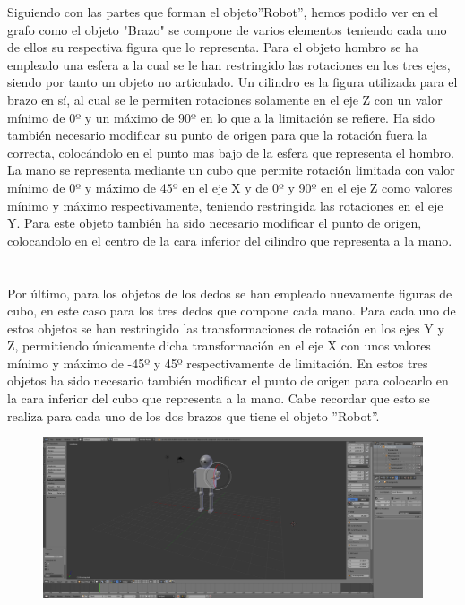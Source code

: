 \documentclass[10pt]{article}
\begin{document}
Siguiendo con las partes que forman el objeto''Robot'', hemos podido ver en el grafo como el objeto "Brazo" se compone de varios elementos teniendo cada uno de ellos su respectiva figura que lo representa. Para el objeto hombro se ha empleado una esfera a la cual se le han restringido las rotaciones en los tres ejes, siendo por tanto un objeto no articulado. Un cilindro es la figura utilizada para el brazo en sí, al cual se le permiten rotaciones solamente en el eje Z con un valor mínimo de 0º y un máximo de 90º en lo que a la limitación se refiere. Ha sido también necesario modificar su punto de origen para que la rotación fuera la correcta, colocándolo en el punto mas bajo de la esfera que representa el hombro. La mano se representa mediante un cubo que permite rotación limitada con valor mínimo de 0º y máximo de 45º en el eje X y de 0º y 90º en el eje Z como valores mínimo y máximo respectivamente, teniendo restringida las rotaciones en el eje Y. Para este objeto también ha sido necesario modificar el punto de origen, colocandolo en el centro de la cara inferior del cilindro que representa a la mano. \\ \\ \\

Por último, para los objetos de los dedos se han empleado nuevamente figuras de cubo, en este caso para los tres dedos que compone cada mano. Para cada uno de estos objetos se han restringido las transformaciones de rotación en los ejes Y y Z, permitiendo únicamente dicha transformación en el eje X con unos valores mínimo y máximo de -45º y 45º respectivamente de limitación. En estos tres objetos ha sido necesario también modificar el punto de origen para colocarlo en la cara inferior del cubo que representa a la mano. Cabe recordar que esto se realiza para cada uno de los dos brazos que tiene el objeto ''Robot''.\\

\begin{figure}[H]
	\begin{center}
	 		\includegraphics[width = 1.00\textwidth]{Imagenes/p2-img8.png}
	\end{center} 
\end{figure}
\end{document}
